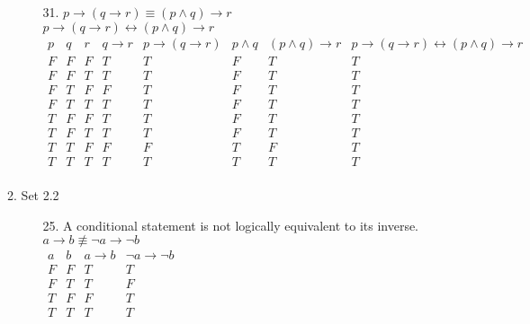 \documentclass[letterpaper]{article}
\begin{document}
\begin{enumerate}
\begin{enumerate}
\begin{itemize}
				\item [31.]
				$p \rightarrow \left( q \rightarrow r \right) \equiv \left( p \wedge q \right) \rightarrow r$ \\
				$p \rightarrow \left( q \rightarrow r \right) \leftrightarrow \left( p \wedge q \right) \rightarrow r$ \\
				$\begin{array}{c|c|c|c|c|c|c|c}
					p & q & r & q \rightarrow r & p \rightarrow \left( q \rightarrow r \right) & p \wedge q & \left( p \wedge q \right) \rightarrow r & p \rightarrow \left( q \rightarrow r \right) \leftrightarrow \left( p \wedge q \right) \rightarrow r \\ \hline
					F & F & F & T & T & F & T & T \\ \hline
					F & F & T & T & T & F & T & T \\ \hline
					F & T & F & F & T & F & T & T \\ \hline
					F & T & T & T & T & F & T & T \\ \hline
					T & F & F & T & T & F & T & T \\ \hline
					T & F & T & T & T & F & T & T \\ \hline
					T & T & F & F & F & T & F & T \\ \hline
					T & T & T & T & T & T & T & T \\ 
				\end{array}$
			\end{itemize}
			
			\item Set 2.2
			\begin{itemize}
				\item [25.]
				A conditional statement is not logically equivalent to its inverse. \\
				$a \rightarrow b \not\equiv \neg a \rightarrow \neg b$ \\
				$\begin{array}{c|c|c|c}
					a & b & a \rightarrow b & \neg a \rightarrow \neg b \\ \hline
					F & F & T & T \\ \hline
					F & T & T & F \\ \hline
					T & F & F & T \\ \hline
					T & T & T & T \\
				\end{array}$
				

\end{itemize}
\end{enumerate}
\end{enumerate}
\end{document}
